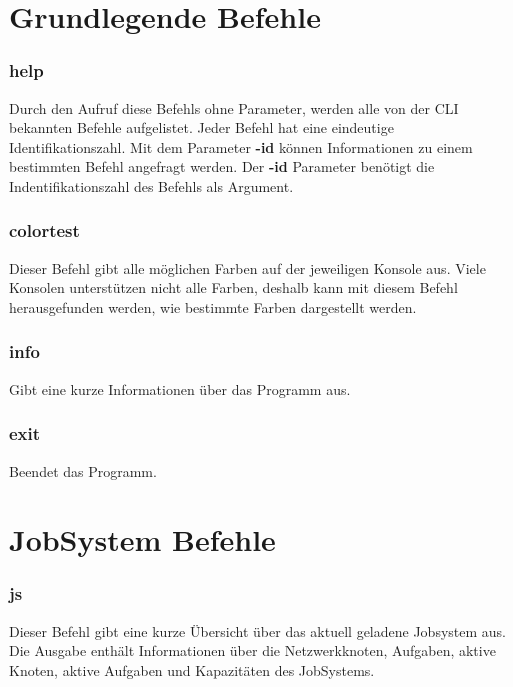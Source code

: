 \documentclass[12pt,a4paper]{report}
\begin{document}
\section{Grundlegende Befehle}

\subsubsection{help}

Durch den Aufruf diese Befehls ohne Parameter, werden alle von der CLI bekannten Befehle aufgelistet. Jeder Befehl hat eine eindeutige Identifikationszahl. Mit dem Parameter \textbf{-id} können Informationen zu einem bestimmten Befehl angefragt werden. Der \textbf{-id} Parameter benötigt die Indentifikationszahl des Befehls als Argument.

\subsubsection{colortest}

Dieser Befehl gibt alle möglichen Farben auf der jeweiligen Konsole aus. Viele Konsolen unterstützen nicht alle Farben, deshalb kann mit diesem Befehl herausgefunden werden, wie bestimmte Farben dargestellt werden.

\subsubsection{info}

Gibt eine kurze Informationen über das Programm aus.

\subsubsection{exit}

Beendet das Programm.

\section{JobSystem Befehle}

\subsubsection{js}

Dieser Befehl gibt eine kurze Übersicht über das aktuell geladene Jobsystem aus. Die Ausgabe enthält Informationen über die Netzwerkknoten, Aufgaben, aktive Knoten, aktive Aufgaben und Kapazitäten des JobSystems.
\end{document}
